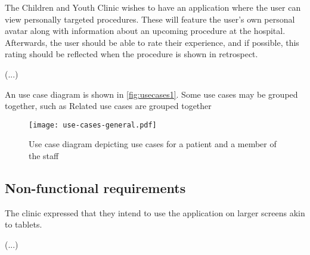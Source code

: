 The Children and Youth Clinic wishes to have an application where the user can view personally targeted procedures. These will feature the user's own personal avatar along with information about an upcoming procedure at the hospital. Afterwards, the user should be able to rate their experience, and if possible, this rating should be reflected when the procedure is shown in retrospect.

(...)

An use case diagram is shown in \autoref{fig:usecases1}. Some use cases may be grouped together, such as Related use cases are grouped together


\begin{figure}
    \centering
    \texttt{[image: use-cases-general.pdf]}
    \caption{Use case diagram depicting use cases for a patient and a member of the staff}
    \label{fig:usecases1}
\end{figure}

\subsection{Non-functional requirements}

The clinic expressed that they intend to use the application on larger screens akin to tablets.

(...)
